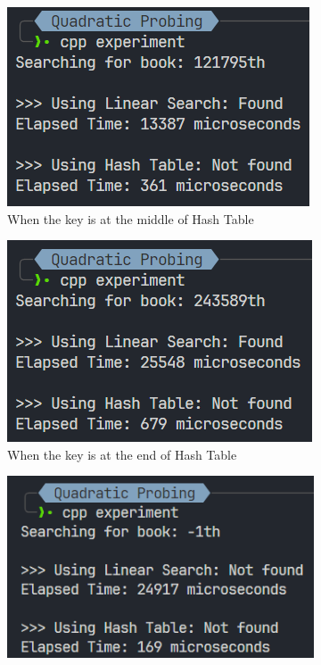 \begin{itemize}
\begin{figure}[!ht]
\begin{subfigure}{0.45\textwidth}
			      \centering
			      \includegraphics[width=\textwidth]{imgs/Quadratic Probing/mid.png}
			      \caption{When the key is at the middle of Hash Table}\label{fig:quadprobing-mid-metric}
		      \end{subfigure}
		      \hfill
		      \begin{subfigure}{0.45\textwidth}
			      \centering
			      \includegraphics[width=\textwidth]{imgs/Quadratic Probing/end.png}
			      \caption{When the key is at the end of Hash Table}\label{fig:quadprobing-end-metric}
		      \end{subfigure}
		      \hfill
		      \begin{subfigure}{0.45\textwidth}
			      \centering
			      \includegraphics[width=\textwidth]{imgs/Quadratic Probing/not-found.png}

\end{subfigure}
\end{figure}
\end{itemize}
